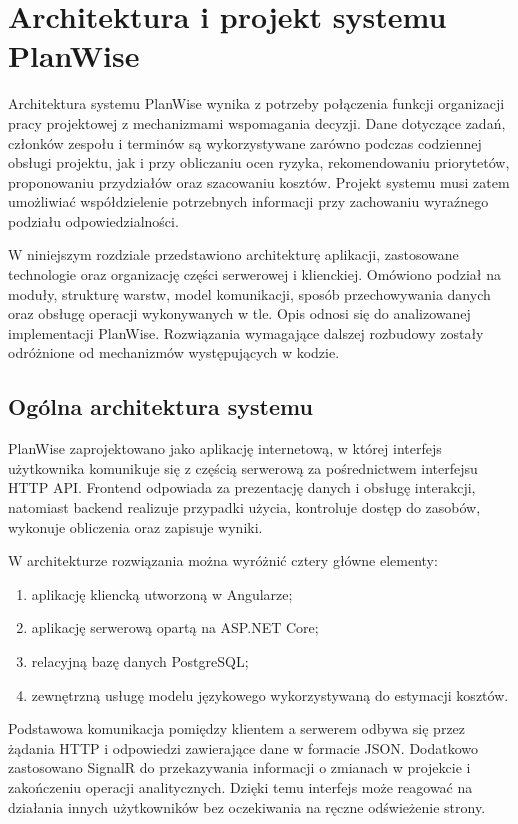 \chapter{Architektura i projekt systemu PlanWise}
\label{chap:architektura}

Architektura systemu PlanWise wynika z potrzeby połączenia funkcji organizacji pracy projektowej z mechanizmami wspomagania decyzji. Dane dotyczące zadań, członków zespołu i terminów są wykorzystywane zarówno podczas codziennej obsługi projektu, jak i przy obliczaniu ocen ryzyka, rekomendowaniu priorytetów, proponowaniu przydziałów oraz szacowaniu kosztów. Projekt systemu musi zatem umożliwiać współdzielenie potrzebnych informacji przy zachowaniu wyraźnego podziału odpowiedzialności.

W niniejszym rozdziale przedstawiono architekturę aplikacji, zastosowane technologie oraz organizację części serwerowej i klienckiej. Omówiono podział na moduły, strukturę warstw, model komunikacji, sposób przechowywania danych oraz obsługę operacji wykonywanych w tle. Opis odnosi się do analizowanej implementacji PlanWise. Rozwiązania wymagające dalszej rozbudowy zostały odróżnione od mechanizmów występujących w kodzie.

\section{Ogólna architektura systemu}

PlanWise zaprojektowano jako aplikację internetową, w której interfejs użytkownika komunikuje się z częścią serwerową za pośrednictwem interfejsu HTTP API. Frontend odpowiada za prezentację danych i obsługę interakcji, natomiast backend realizuje przypadki użycia, kontroluje dostęp do zasobów, wykonuje obliczenia oraz zapisuje wyniki.

W architekturze rozwiązania można wyróżnić cztery główne elementy:

\begin{enumerate}
    \item aplikację kliencką utworzoną w Angularze;
    \item aplikację serwerową opartą na ASP.NET Core;
    \item relacyjną bazę danych PostgreSQL;
    \item zewnętrzną usługę modelu językowego wykorzystywaną do estymacji kosztów.
\end{enumerate}

Podstawowa komunikacja pomiędzy klientem a serwerem odbywa się przez żądania HTTP i odpowiedzi zawierające dane w formacie JSON. Dodatkowo zastosowano SignalR do przekazywania informacji o zmianach w projekcie i zakończeniu operacji analitycznych. Dzięki temu interfejs może reagować na działania innych użytkowników bez oczekiwania na ręczne odświeżenie strony.

